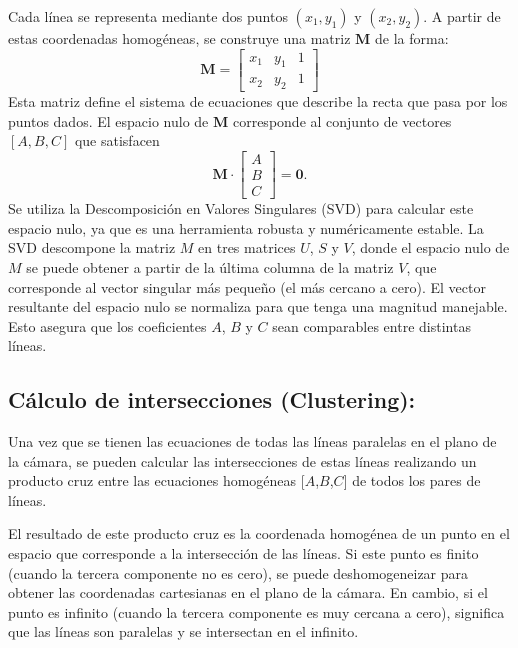 Cada línea se representa mediante dos puntos $(x_1, y_1)$ y $(x_2, y_2)$. A partir de estas coordenadas homogéneas,
se construye una matriz $\mathbf{M}$ de la forma:
\[
    \mathbf{M} = \begin{bmatrix}
        x_1 & y_1 & 1 \\
        x_2 & y_2 & 1
    \end{bmatrix}
\]
Esta matriz define el sistema de ecuaciones que describe la recta que pasa por los puntos dados.
El espacio nulo de $\mathbf{M}$ corresponde al conjunto de vectores $[A,B,C]$ que satisfacen
\[
    \mathbf{M} \cdot \begin{bmatrix}
        A \\ B \\ C
    \end{bmatrix} = \mathbf{0}.
\]
Se utiliza la Descomposición en Valores Singulares (SVD) \cite{golub2013matrix} para calcular este espacio nulo, ya que es una herramienta robusta y numéricamente estable.
La SVD descompone la matriz \(M\) en tres matrices \(U\), \(S\) y \(V\), donde el espacio nulo de \(M\) se puede obtener a partir de la última columna de la matriz \(V\), que corresponde al vector singular más pequeño (el más cercano a cero).
El vector resultante del espacio nulo se normaliza para que tenga una magnitud manejable.
Esto asegura que los coeficientes \(A\), \(B\) y \(C\) sean comparables entre distintas líneas.

\subsection{Cálculo de intersecciones (Clustering):}

Una vez que se tienen las ecuaciones de todas las líneas paralelas en el plano de la cámara, se pueden calcular las intersecciones de estas líneas realizando un producto cruz entre las ecuaciones homogéneas [\(A\),\(B\),\(C\)] de todos los pares de líneas.

El resultado de este producto cruz es la coordenada homogénea de un punto en el espacio que corresponde a la intersección de las líneas.
Si este punto es finito (cuando la tercera componente no es cero), se puede deshomogeneizar para obtener las coordenadas cartesianas en el plano de la cámara.
En cambio, si el punto es infinito (cuando la tercera componente es muy cercana a cero), significa que las líneas son paralelas y se intersectan en el infinito.


